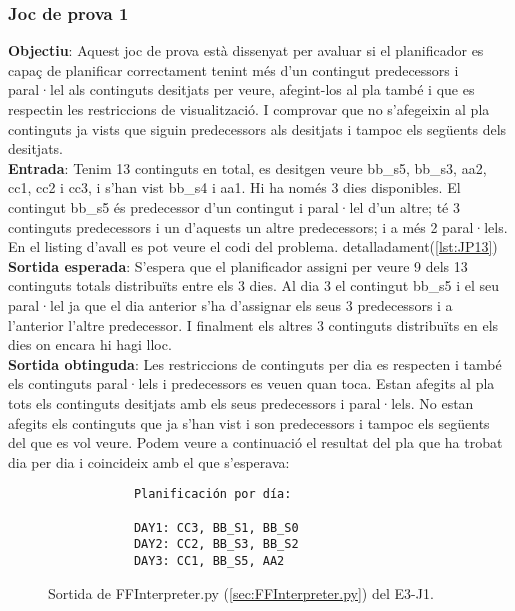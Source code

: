 \documentclass[a4paper]{article}
\begin{document}
	\subsubsection*{Joc de prova 1}
	
	\noindent \textbf{Objectiu}: Aquest joc de prova està dissenyat per avaluar si el planificador es capaç de planificar correctament tenint més d'un contingut predecessors i paral·lel als continguts desitjats per veure, afegint-los al pla també i que es respectin les restriccions de visualització. I comprovar que no s'afegeixin al pla continguts ja vists que siguin predecessors als desitjats i tampoc els següents dels desitjats.  \\
	
	\noindent \textbf{Entrada}: Tenim 13 continguts en total, es desitgen veure bb\_s5, bb\_s3, aa2, cc1, cc2 i cc3, i s'han vist bb\_s4 i aa1. Hi ha només 3 dies disponibles. El contingut bb\_s5 és predecessor d'un contingut i paral·lel d'un altre; té 3 continguts predecessors i un d'aquests un altre predecessors; i a més 2 paral·lels. En el listing d'avall es pot veure el codi del problema.  detalladament(\ref{lst:JP13})\\
	
	\noindent \textbf{Sortida esperada}: S'espera que el planificador assigni per veure 9 dels 13 continguts totals distribuïts entre els 3 dies. Al dia 3 el contingut bb\_s5 i el seu paral·lel ja que el dia anterior s'ha d'assignar els seus 3 predecessors i a l'anterior l'altre predecessor. I finalment els altres 3 continguts distribuïts en els dies on encara hi hagi lloc. \\
	
	\noindent \textbf{Sortida obtinguda}:  Les restriccions de continguts per dia es respecten i també els continguts paral·lels i predecessors es veuen quan toca.  Estan afegits al pla tots els continguts desitjats amb els seus predecessors i paral·lels. No estan afegits els continguts que ja s'han vist i son predecessors i tampoc els següents del que es vol veure. Podem veure a continuació el resultat del pla que ha trobat dia per dia i coincideix amb el que s'esperava:
	
	\begin{figure}[H]
		\centering
		\begin{verbatim}
			Planificación por día:
			
			DAY1: CC3, BB_S1, BB_S0
			DAY2: CC2, BB_S3, BB_S2
			DAY3: CC1, BB_S5, AA2
		\end{verbatim}
		\caption{Sortida de FFInterpreter.py (\ref{sec:FFInterpreter.py}) del E3-J1.}
	\end{figure}
	
\end{document}
